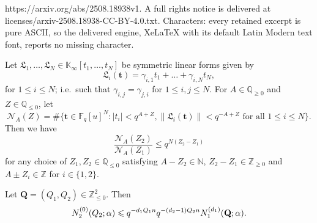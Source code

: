 \documentclass[10pt,a4paper]{amsart}
\let\mathcal\mathscr
\numberwithin{equation}{section}
\newcommand{\FF}{\mathbb{F}}
\newcommand{\KK}{\mathbb{K}}
\newcommand{\NN}{\mathbb{N}}
\newcommand{\QQ}{\mathbb{Q}}
\newcommand{\ZZ}{\mathbb{Z}}
\renewcommand{\geq}{\geqslant}
\renewcommand{\leq}{\leqslant}
\renewcommand{\t}{\mathbf{t}}
\begin{document}
https://arxiv.org/abs/2508.18938v1. A full rights notice is delivered at licenses/arxiv-2508.18938-CC-BY-4.0.txt. Characters: every retained excerpt is pure ASCII, so the delivered engine, XeLaTeX with its default Latin Modern text font, reports no missing character.
\begin{lemma}
\label{shrink2}
Let $\mathfrak{L}_1, \dots, \mathfrak{L}_N \in \KK_\infty[t_1, \dots, t_N]$ be symmetric linear forms given by
$$\mathfrak{L}_i(\t) = \gamma_{i,1} t_1 + \dots + \gamma_{i,N} t_N,$$
for $1 \leq i \leq N$; i.e.\ such that $\gamma_{i,j} = \gamma_{j,i}$ for $1 \leq i, j \leq N$.
For  $A \in \QQ_{\geq 0}$ and $Z \in \QQ_{\leq 0}$, let
$$
\mathcal{N}_{A}(Z)
= \#
\{ \t \in  \FF_q[u]^N: |t_i|< q^{A +  Z  }, \| \mathfrak{L}_i(\t) \| < q^{- A +  Z }  \text{ for all $1 \leq i \leq N$} \}.
$$
Then 
we have
$$
\frac{ \mathcal{N}_{A}(Z_2)}{ \mathcal{N}_{A} ( Z_1 )} \leq  q^{ N (  Z_2  -  Z_1 )  }
$$
for any choice of $Z_1, Z_2 \in \QQ_{\leq 0}$ satisfying 
$A - Z_2 \in \NN$, 
$Z_2 - Z_1 \in \mathbb{Z}_{\geq 0}$ and 
$
A \pm Z_i \in \mathbb{Z}$
for $i\in \{1,2\}$.
\end{lemma}

\begin{lemma}\label{ineq 1-40}
Let 
$\mathbf{Q}=(Q_1, Q_2) \in \ZZ_{\leq 0}^2$. Then
$$N_2^{(0)}(Q_2; \alpha) \leq
q^{- d_1 Q_1 n} q^{-  (d_2-1) Q_2  n }  N_1^{(d_1)}(\bf Q ; \alpha).
$$
\end{lemma}
\end{document}
